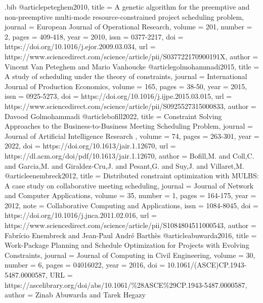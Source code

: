 \begin{filecontents}{\jobname.bib}
    @article{peteghem2010,
        title = {A genetic algorithm for the preemptive and non-preemptive multi-mode resource-constrained project scheduling problem},
        journal = {European Journal of Operational Research},
        volume = {201},
        number = {2},
        pages = {409-418},
        year = {2010},
        issn = {0377-2217},
        doi = {https://doi.org/10.1016/j.ejor.2009.03.034},
        url = {https://www.sciencedirect.com/science/article/pii/S037722170900191X},
        author = {Vincent Van Peteghem and Mario Vanhoucke}
    }
    @article{golmohammadi2015,
        title = {A study of scheduling under the theory of constraints},
        journal = {International Journal of Production Economics},
        volume = {165},
        pages = {38-50},
        year = {2015},
        issn = {0925-5273},
        doi = {https://doi.org/10.1016/j.ijpe.2015.03.015},
        url = {https://www.sciencedirect.com/science/article/pii/S0925527315000833},
        author = {Davood Golmohammadi}
    }
    @article{bofill2022,
        title = {Constraint Solving Approaches to the Business-to-Business Meeting Scheduling Problem},
        journal = {Journal of Artificial Intelligence Research },
        volume = {74},
        pages = {263-301},
        year = {2022},
        doi = {https://doi.org/10.1613/jair.1.12670},
        url = {https://dl.acm.org/doi/pdf/10.1613/jair.1.12670},
        author = {Bofill,M. and Coll,C. and Garcia,M. and Giraldez-Cru,J. and Pesant,G. and Suy,J. and Villaret,M.}
    }
    @article{enembreck2012,
        title = {Distributed constraint optimization with MULBS: A case study on collaborative meeting scheduling},
        journal = {Journal of Network and Computer Applications},
        volume = {35},
        number = {1},
        pages = {164-175},
        year = {2012},
        note = {Collaborative Computing and Applications},
        issn = {1084-8045},
        doi = {https://doi.org/10.1016/j.jnca.2011.02.016},
        url = {https://www.sciencedirect.com/science/article/pii/S1084804511000543},
        author = {Fabrício Enembreck and Jean-Paul {André Barthès}}
    }
    @article{abuwarda2016,
        title = {Work-Package Planning and Schedule Optimization for Projects with Evolving Constraints},
        journal = {Journal of Computing in Civil Engineering},
        volume = {30},
        number = {6},
        pages = {04016022},
        year = {2016},
        doi = {10.1061/(ASCE)CP.1943-5487.0000587},
        URL = {https://ascelibrary.org/doi/abs/10.1061/\%28ASCE\%29CP.1943-5487.0000587},
        author = {Zinab Abuwarda and Tarek Hegazy}
    }


\end{filecontents}
